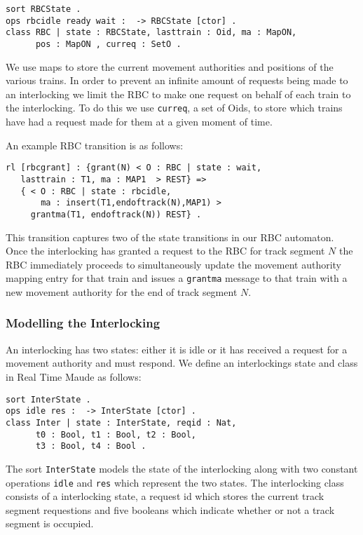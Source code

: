 \begin{lstlisting}[caption = The RBC state and class definition in Maude]
sort RBCState .
ops rbcidle ready wait :  -> RBCState [ctor] .
class RBC | state : RBCState, lasttrain : Oid, ma : MapON, 
      pos : MapON , curreq : SetO .
\end{lstlisting}

We use maps to store the current movement authorities and positions of the various trains. In order to prevent an infinite amount of requests being made to an interlocking we limit the RBC to make one request on behalf of each train to the interlocking.  To do this we use  \texttt{curreq}, a set of Oids, to store which trains have had a request made for them at a given moment of time.

An example RBC transition is as follows:
\begin{lstlisting}[caption = The state transition for the granting of a movement authority]
rl [rbcgrant] : {grant(N) < O : RBC | state : wait, 
   lasttrain : T1, ma : MAP1  > REST} => 
   { < O : RBC | state : rbcidle, 
       ma : insert(T1,endoftrack(N),MAP1) > 
     grantma(T1, endoftrack(N)) REST} .
\end{lstlisting}

This transition captures two of the state transitions in our RBC automaton. Once the interlocking has granted a request to the RBC for track segment $N$ the RBC immediately proceeds to simultaneously update the movement authority mapping entry for that train and issues a \texttt{grantma} message to that train with a new movement authority for the end of track segment $N$.

\subsubsection*{Modelling the Interlocking}
An interlocking has two states: either it is idle or it has received a request for a movement authority and must respond. We define an interlockings state and class in Real Time Maude as follows:

\begin{lstlisting}[caption = The interlocking class and states in Maude]
sort InterState .
ops idle res :  -> InterState [ctor] .
class Inter | state : InterState, reqid : Nat, 
      t0 : Bool, t1 : Bool, t2 : Bool, 
      t3 : Bool, t4 : Bool .
\end{lstlisting}

The sort \texttt{InterState} models the state of the interlocking along with two constant operations \texttt{idle} and \texttt{res} which represent the two states. The interlocking class consists of a interlocking state, a request id which stores the current track segment requestions and five booleans which indicate whether or not a track segment is occupied. 

